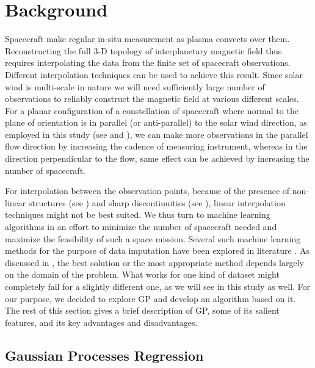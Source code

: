     \section{Background} \label{sec:bgnd8}

        Spacecraft make regular in-situ measurement as plasma convects over them. Reconstructing the
        full 3-D topology of interplanetary magnetic field thus requires interpolating the data from
        the finite set of spacecraft observations. Different interpolation techniques can be used to
        achieve this result. Since solar wind is multi-scale in nature \citep{Verscharen2019} we
        will need sufficiently large number of observations to reliably construct the magnetic field
        at various different scales. For a planar configuration of a constellation of spacecraft
        where normal to the plane of orientation is in parallel (or anti-parallel) to the solar wind
        direction, as employed in this study (see  and ), we can
        make more observations in the parallel flow direction by increasing the cadence of measuring
        instrument, whereas in the direction perpendicular to the flow, same effect can be achieved
        by increasing the number of spacecraft.
        
        For interpolation between the observation points, because of the presence of non-linear
        structures (see ) and sharp discontinuities (see ), linear
        interpolation techniques might not be best suited. We thus turn to machine learning
        algorithms in an effort to minimize the number of spacecraft needed and maximize the
        feasibility of such a space mission. Several such machine learning methods for the purpose
        of data imputation have been explored in literature \citep{Lin2019, Bertsimas2017,
        Wang2018}. As discussed in \citet{Lin2019}, the best solution or the most appropriate method
        depends largely on the domain of the problem. What works for one kind of dataset might
        completely fail for a slightly different one, as we will see in this study as well. For our
        purpose, we decided to explore GP and develop an algorithm based on it. The rest of this
        section gives a brief description of GP, some of its salient features, and its key
        advantages and disadvantages.

        \subsection{Gaussian Processes Regression} \label{sec:gpr}

